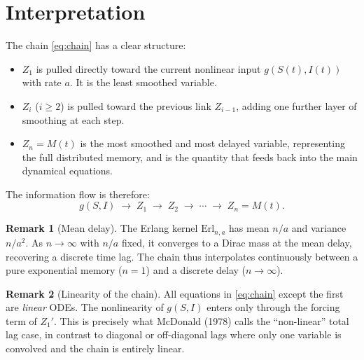 \documentclass[12pt,a4paper]{article}
\theoremstyle{definition}
\newtheorem{remark}{Remark}
\begin{document}
\section{Interpretation}

The chain \eqref{eq:chain} has a clear structure:

\begin{itemize}
    \item \textbf{$Z_1$} is pulled directly toward the current nonlinear input $g(S(t), I(t))$
          with rate $a$. It is the least smoothed variable.
    \item \textbf{$Z_i$} ($i \geq 2$) is pulled toward the previous link $Z_{i-1}$, adding
          one further layer of smoothing at each step.
    \item \textbf{$Z_n = M(t)$} is the most smoothed and most delayed variable, representing
          the full distributed memory, and is the quantity that feeds back into the main
          dynamical equations.
\end{itemize}

The information flow is therefore:
\[
    g(S,I) \;\longrightarrow\; Z_1 \;\longrightarrow\; Z_2 \;\longrightarrow\; \cdots
    \;\longrightarrow\; Z_n = M(t).
\]

\begin{remark}[Mean delay]
The Erlang kernel $\mathrm{Erl}_{n,a}$ has mean $n/a$ and variance $n/a^2$. As $n \to \infty$
with $n/a$ fixed, it converges to a Dirac mass at the mean delay, recovering a discrete
time lag. The chain thus interpolates continuously between a pure exponential memory
($n=1$) and a discrete delay ($n \to \infty$).
\end{remark}

\begin{remark}[Linearity of the chain]
All equations in \eqref{eq:chain} except the first are \emph{linear} ODEs. The nonlinearity
of $g(S,I)$ enters only through the forcing term of $Z_1'$. This is precisely what
McDonald (1978) calls the ``non-linear'' total lag case, in contrast to diagonal or
off-diagonal lags where only one variable is convolved and the chain is entirely linear.
\end{remark}
\end{document}
